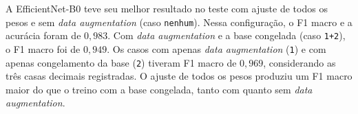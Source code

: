 A EfficientNet-B0 teve seu melhor resultado no teste com ajuste de todos os pesos e sem \textit{data augmentation} (caso \texttt{nenhum}).
Nessa configuração, o F1 macro e a acurácia foram de \(0{,}983\).
Com \textit{data augmentation} e a base congelada (caso \texttt{1+2}), o F1 macro foi de \(0{,}949\).
Os casos com apenas \textit{data augmentation} (\texttt{1}) e com apenas congelamento da base (\texttt{2}) tiveram F1 macro de \(0{,}969\), considerando as três casas decimais registradas.
O ajuste de todos os pesos produziu um F1 macro maior do que o treino com a base congelada, tanto com quanto sem \textit{data augmentation}.
